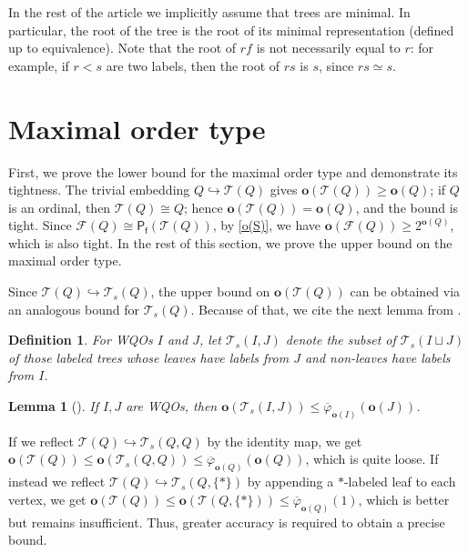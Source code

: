 \documentclass[runningheads]{llncs}
\let \leq \leqslant
\let \geq \geqslant
\let \phi \varphi
\let \embeds \hookrightarrow
\renewcommand \S [1][]{\mathsf{P_f^{#1}}}
\def \T {\mathcal{T}}
\def \F {\mathcal{F}}
\def \o {\textbf{o}}
\newtheorem{lemma}{Lemma}
\newtheorem{definition}{Definition}
\begin{document}
In the rest of the article we implicitly assume that trees are minimal. In particular, the root of the tree is the root of its minimal representation (defined up to equivalence). Note that the root of $rf$ is not necessarily equal to $r$: for example, if $r < s$ are two labels, then the root of $rs$ is $s$, since $rs \simeq s$.





\section{Maximal order type}\label{section o}

First, we prove the lower bound for the maximal order type and demonstrate its tightness.
The trivial embedding $Q \embeds \T(Q)$ gives $\o(\T(Q)) \geq \o(Q)$; if $Q$ is an ordinal, then $\T(Q) \cong Q$; hence $\o(\T(Q)) = \o(Q)$, and the bound is tight. Since $\F(Q) \cong \S(\T(Q))$, by \cref{o(S)}, we have $\o(\F(Q)) \geq 2^{\o(Q)}$, which is also tight. In the rest of this section, we prove the upper bound on the maximal order type.

Since $\T(Q) \embeds \T_s(Q)$, the upper bound on $\o(\T(Q))$ can be obtained via an analogous bound for $\T_s(Q)$. Because of that, we cite the next lemma from \cite{Friedman2023}.

\begin{definition}
    For WQOs $I$ and $J$, let $\T_s(I, J)$ denote the subset of $\T_s(I \sqcup J)$ of those labeled trees whose leaves have labels from $J$ and non-leaves have labels from $I$.
\end{definition}

\begin{lemma}[{\cite[lemma 6.4]{Friedman2023}}]\label{o(T(I,J))}
    If $I,J$ are WQOs, then $\o(\T_s(I, J)) \leq \overline{\phi}_{\o(I)}(\o(J))$.
\end{lemma}

If we reflect $\T(Q) \embeds \T_s(Q, Q)$ by the identity map, we get $\o(\T(Q)) \leq \o(\T_s(Q, Q)) \leq \overline{\phi}_{\o(Q)}(\o(Q))$, which is quite loose. If instead we reflect $\T(Q) \embeds \T_s(Q, \{*\})$ by appending a $*$-labeled leaf to each vertex, we get $\o(\T(Q)) \leq \o(\T(Q, \{*\})) \leq \overline{\phi}_{\o(Q)}(1)$, which is better but remains insufficient. Thus, greater accuracy is required to obtain a precise bound.
\end{document}
